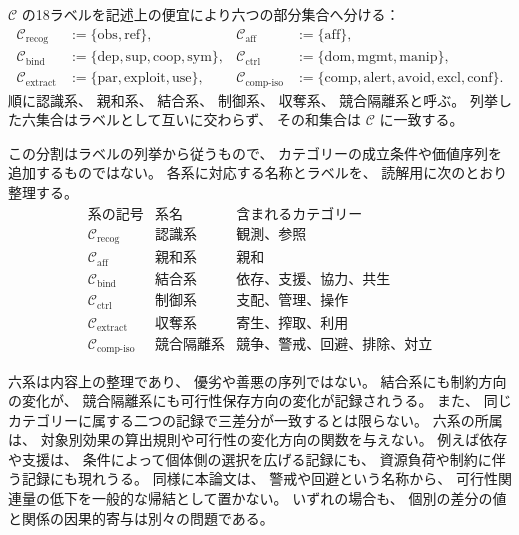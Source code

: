 \begin{definition}
\label{def:six_system_classification}
$\mathcal C$ の18ラベルを記述上の便宜により六つの部分集合へ分ける：
\[
\begin{aligned}
\mathcal C_{\mathrm{recog}}&:=\{\mathrm{obs},\mathrm{ref}\},&
\mathcal C_{\mathrm{aff}}&:=\{\mathrm{aff}\},\\
\mathcal C_{\mathrm{bind}}&:=\{\mathrm{dep},\mathrm{sup},\mathrm{coop},\mathrm{sym}\},&
\mathcal C_{\mathrm{ctrl}}&:=\{\mathrm{dom},\mathrm{mgmt},\mathrm{manip}\},\\
\mathcal C_{\mathrm{extract}}&:=\{\mathrm{par},\mathrm{exploit},\mathrm{use}\},&
\mathcal C_{\mathrm{comp\mbox{-}iso}}&:=\{\mathrm{comp},\mathrm{alert},\mathrm{avoid},\mathrm{excl},\mathrm{conf}\}.
\end{aligned}
\]
順に認識系、
親和系、
結合系、
制御系、
収奪系、
競合隔離系と呼ぶ。
列挙した六集合はラベルとして互いに交わらず、
その和集合は $\mathcal C$ に一致する。

この分割はラベルの列挙から従うもので、
カテゴリーの成立条件や価値序列を追加するものではない。
各系に対応する名称とラベルを、
読解用に次のとおり整理する。
\[
\begin{array}{c|l|l}
\text{系の記号}&\text{系名}&\text{含まれるカテゴリー}\\\hline
\mathcal C_{\mathrm{recog}}&\text{認識系}&\text{観測、参照}\\
\mathcal C_{\mathrm{aff}}&\text{親和系}&\text{親和}\\
\mathcal C_{\mathrm{bind}}&\text{結合系}&\text{依存、支援、協力、共生}\\
\mathcal C_{\mathrm{ctrl}}&\text{制御系}&\text{支配、管理、操作}\\
\mathcal C_{\mathrm{extract}}&\text{収奪系}&\text{寄生、搾取、利用}\\
\mathcal C_{\mathrm{comp\mbox{-}iso}}&\text{競合隔離系}&\text{競争、警戒、回避、排除、対立}
\end{array}
\]
\end{definition}

\begin{remark}[六系分類の位置づけ]
\label{rem:six_system_role}
六系は内容上の整理であり、
優劣や善悪の序列ではない。
結合系にも制約方向の変化が、
競合隔離系にも可行性保存方向の変化が記録されうる。
また、
同じカテゴリーに属する二つの記録で三差分が一致するとは限らない。
六系の所属は、
対象別効果の算出規則や可行性の変化方向の関数を与えない。
例えば依存や支援は、
条件によって個体側の選択を広げる記録にも、
資源負荷や制約に伴う記録にも現れうる。
同様に本論文は、
警戒や回避という名称から、
可行性関連量の低下を一般的な帰結として置かない。
いずれの場合も、
個別の差分の値と関係の因果的寄与は別々の問題である。
\end{remark}

